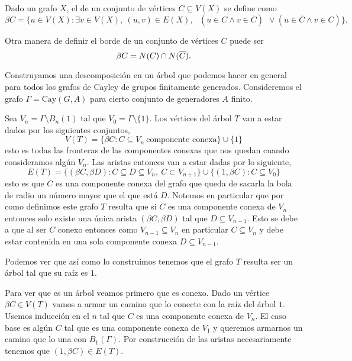 \documentclass[tesis.tex]{subfiles}
\begin{document}
\begin{deff}
	Dado un grafo $X$, el  de un conjunto de vértices $C \subseteq V(X)$ se define como
	\[
	\beta C = \{ u \in V(X) : \exists v \in V(X), \ (u,v) \in E(X), \  \ \ (u \in C \wedge v \in \overline C) \ \ \lor  (u \in \overline C \wedge v \in  C)   \}.
	\] 
\end{deff}

\begin{obs}
Otra manera de definir el borde de un conjunto de vértices $C$ puede ser 
\[
	\beta C = N(C) \cap N(\overline{ C}).
\]
\end{obs}

\begin{ej}\label{desc-grafo-cayley}%
	
	Construyamos una descomposición en un árbol que podemos hacer en general para todos los grafos de Cayley de grupos finitamente generados. 
	Consideremos el grafo $\Gamma = \text{Cay}(G,A)$ para cierto conjunto de generadores $A$ finito.
	
	
	Sea $V_n = \Gamma \setminus B_n(1) $ tal que $V_0 = \Gamma \setminus \{1\}$. 
	Los vértices del árbol $T$ van a estar dados por los siguientes conjuntos,
	\[
	V(T) = \{  \beta C : C \subseteq V_n \ \text{componente conexa}   \} \cup \{ 1 \}
	\]
	esto es todas las fronteras de las componentes conexas que nos quedan cuando consideramos algún $V_n$. 
	Las aristas entonces van a estar dadas por lo siguiente,
	\[
	E(T) = \{ (\beta C , \beta D) : C \subseteq D \subseteq V_n, \ C \subset V_{n+1}   \} \cup \{  (1, \beta C) : C \subseteq V_0  \}
	\]
	esto es que $C$ es una componente conexa del grafo que queda de sacarla la bola de radio un número mayor que el que está $D$.
	Notemos en particular que por como definimos este grafo $T$ resulta que si $C$ es una componente conexa de $V_n$ entonces solo existe una única arista $(\beta C, \beta D)$ tal que $D \subseteq V_{n-1}$. 
	Esto se debe a que al ser $C$ conexo entonces como $V_{n-1} \subseteq V_{n}$ en particular $C \subseteq V_{n}$ y debe estar contenida en una sola componente conexa $D \subseteq V_{n-1}.$
	
	
	Podemos ver que así como lo construimos tenemos que el grafo $T$ resulta ser un árbol tal que su raíz es $1$. 
	
	Para ver que es un árbol veamos primero que es conexo. Dado un vértice $\beta C \in V(T)$ vamos a armar un camino que lo conecte con la raíz del árbol $1$. 
	Usemos inducción en el $n$ tal que $C$ es una componente conexa de $V_n$. 
	El caso base es algún $C$ tal que es una componente conexa de $V_1$ y queremos armarnos un camino que lo una con $B_1(\Gamma)$. 
	Por construcción de las aristas necesariamente tenemos que $(1, \beta C) \in E(T)$.
		

\end{ej}
\end{document}
